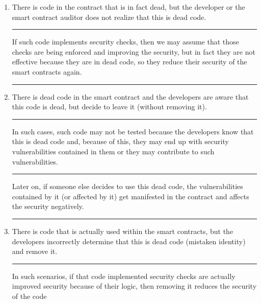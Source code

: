 \begin{enumerate}
\def\labelenumi{\arabic{enumi}.}
\item
  There is code in the contract that is in fact dead, but the developer
  or the smart contract auditor does not realize that this is dead code.

  \begin{center}\rule{0.5\linewidth}{0.5pt}\end{center}

  If such code implements security checks, then we may assume that those
  checks are being enforced and improving the security, but in fact they
  are not effective because they are in dead code, so they reduce their
  security of the smart contracts again.

  \begin{center}\rule{0.5\linewidth}{0.5pt}\end{center}
\item
  There is dead code in the smart contract and the developers are aware
  that this code is dead, but decide to leave it (without removing it).

  \begin{center}\rule{0.5\linewidth}{0.5pt}\end{center}

  In such cases, such code may not be tested because the developers know
  that this is dead code and, because of this, they may end up with
  security vulnerabilities contained in them or they may contribute to
  such vulnerabilities.

  \begin{center}\rule{0.5\linewidth}{0.5pt}\end{center}

  Later on, if someone else decides to use this dead code, the
  vulnerabilities contained by it (or affected by it) get manifested in
  the contract and affects the security negatively.

  \begin{center}\rule{0.5\linewidth}{0.5pt}\end{center}
\item
  There is code that is actually used within the smart contracts, but
  the developers incorrectly determine that this is dead code (mistaken
  identity) and remove it.

  \begin{center}\rule{0.5\linewidth}{0.5pt}\end{center}

  In such scenarios, if that code implemented security checks are
  actually improved security because of their logic, then removing it
  reduces the security of the code
\end{enumerate}

